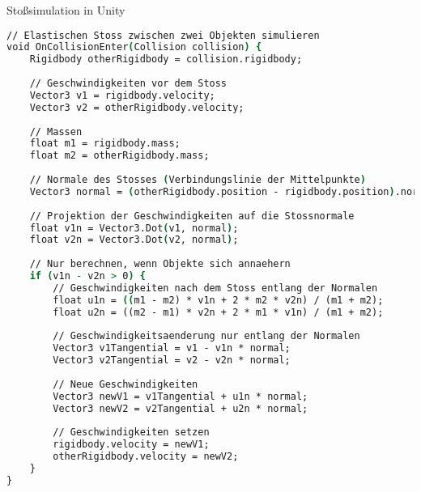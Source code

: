 \begin{examplecode}{Stoßsimulation in Unity}\\
    \begin{lstlisting}[language=csh, style=basesmol]
// Elastischen Stoss zwischen zwei Objekten simulieren
void OnCollisionEnter(Collision collision) {
    Rigidbody otherRigidbody = collision.rigidbody;
    
    // Geschwindigkeiten vor dem Stoss
    Vector3 v1 = rigidbody.velocity;
    Vector3 v2 = otherRigidbody.velocity;
    
    // Massen
    float m1 = rigidbody.mass;
    float m2 = otherRigidbody.mass;
    
    // Normale des Stosses (Verbindungslinie der Mittelpunkte)
    Vector3 normal = (otherRigidbody.position - rigidbody.position).normalized;
    
    // Projektion der Geschwindigkeiten auf die Stossnormale
    float v1n = Vector3.Dot(v1, normal);
    float v2n = Vector3.Dot(v2, normal);
    
    // Nur berechnen, wenn Objekte sich annaehern
    if (v1n - v2n > 0) {
        // Geschwindigkeiten nach dem Stoss entlang der Normalen
        float u1n = ((m1 - m2) * v1n + 2 * m2 * v2n) / (m1 + m2);
        float u2n = ((m2 - m1) * v2n + 2 * m1 * v1n) / (m1 + m2);
        
        // Geschwindigkeitsaenderung nur entlang der Normalen
        Vector3 v1Tangential = v1 - v1n * normal;
        Vector3 v2Tangential = v2 - v2n * normal;
        
        // Neue Geschwindigkeiten
        Vector3 newV1 = v1Tangential + u1n * normal;
        Vector3 newV2 = v2Tangential + u2n * normal;
        
        // Geschwindigkeiten setzen
        rigidbody.velocity = newV1;
        otherRigidbody.velocity = newV2;
    }
}
    \end{lstlisting}
\end{examplecode}